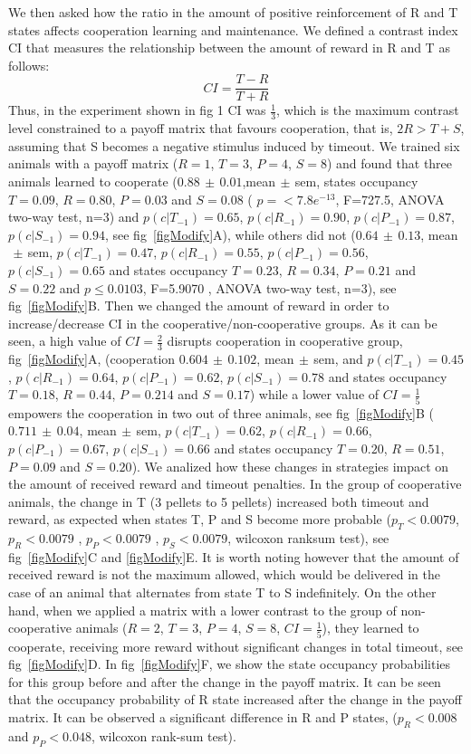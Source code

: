 \documentclass[10pt,letterpaper]{article}
\begin{document}
We then asked how the ratio in the amount of positive reinforcement of R and T states affects cooperation learning and maintenance. We defined a contrast index CI that measures the relationship between the amount of reward in R and T as follows:
    \[CI=\frac{T-R}{T+R}\]
Thus, in the experiment shown in fig 1 CI was $\frac{1}{3}$, which is the maximum contrast level constrained to a payoff matrix that favours cooperation, that is, $2R>T+S$, assuming that S becomes a negative stimulus induced by timeout. We trained six animals with a payoff matrix ($R=1$, $T=3$, $P=4$, $S=8$) and found that three animals learned to cooperate ($0.88\,\pm\,0.01$,mean$\,\pm\,$sem, states occupancy $T=0.09$, $R=0.80$, $P=0.03$ and $S=0.08$ ( $p=<7.8e^{-13}$, F=727.5, ANOVA two-way test, n=3) and $p(c|T_{-1})=0.65$, $p(c|R_{-1})=0.90$, $p(c|P_{-1})=0.87$, $p(c|S_{-1})=0.94$, see fig~\ref{figModify}A), while others did not ($0.64\,\pm\,0.13$, mean$\,\pm\,$sem, $p(c|T_{-1})=0.47$, $p(c|R_{-1})=0.55$, $p(c|P_{-1})=0.56$, $p(c|S_{-1})=0.65$ and states occupancy $T=0.23$, $R=0.34$, $P=0.21$ and $S=0.22$ and $p\le0.0103$, F=5.9070 , ANOVA two-way test, n=3), see fig~\ref{figModify}B. Then we changed the amount of reward in order to increase/decrease CI in the cooperative/non-cooperative groups. As it can be seen, a high value of $CI=\frac{2}{3}$ disrupts cooperation in cooperative group, fig~\ref{figModify}A, (cooperation $0.604\,\pm\,0.102$, mean$\,\pm\,$sem, and $p(c|T_{-1})=0.45$, $p(c|R_{-1})=0.64$, $p(c|P_{-1})=0.62$, $p(c|S_{-1})=0.78$ and states occupancy $T=0.18$, $R=0.44$, $P=0.214$ and $S=0.17$) while a lower value of $CI=\frac{1}{5}$ empowers the cooperation in two out of three animals, see fig~\ref{figModify}B ($0.711\,\pm\,0.04$, mean$\,\pm\,$sem, $p(c|T_{-1})=0.62$, $p(c|R_{-1})=0.66$, $p(c|P_{-1})=0.67$, $p(c|S_{-1})=0.66$ and states occupancy $T=0.20$, $R=0.51$, $P=0.09$ and $S=0.20$). We analized how these changes in strategies impact on the amount of received reward and timeout penalties. In the group of cooperative animals, the change in T (3 pellets to 5 pellets) increased both timeout and reward, as expected when states T, P and S become more probable ($p_T<0.0079$, $p_R<0.0079$ , $p_P< 0.0079$ , $p_S< 0.0079$, wilcoxon ranksum test), see fig~\ref{figModify}C and \ref{figModify}E. It is worth noting however that the amount of received reward is not the maximum allowed, which would be delivered in the case of an animal that alternates from state T to S indefinitely. On the other hand, when we applied a matrix with a lower contrast to the group of non-cooperative animals ($R=2$, $T=3$, $P=4$, $S=8$, $CI=\frac{1}{5}$), they learned to cooperate, receiving more reward without significant changes in total timeout, see fig~\ref{figModify}D. In fig~\ref{figModify}F, we show the state occupancy probabilities for this group before and after the change in the payoff matrix. It can be seen that the occupancy probability of R state increased after the change in the payoff matrix. It can be observed a significant difference in R and P states, ($p_R <0.008$ and $p_P<0.048$, wilcoxon rank-sum test).
\end{document}
